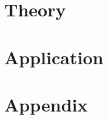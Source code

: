 \documentclass[
paper=a4,
fontsize = 12pt, %
headsepline,     %
titlepage,       %
numbers=noenddot,
headings=optiontohead, %
]{scrbook}
\begin{document}
\frontmatter
{}
\cofoot[\pagemark]{}
\rofoot[]{}



\tableofcontents
\listoffigures
\listoftables


\printnomenclature

\mainmatter
{}

\rofoot[]{\pagemark}




\part*{Theory}\label{part:theory}

















\part*{Application}\label{part:application}




\appendix
\part*{Appendix}\label{part:appendix}

\printbibliography
\end{document}
